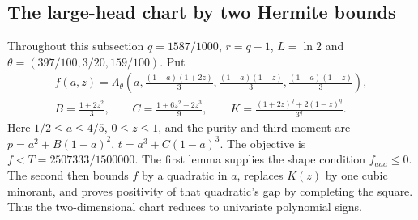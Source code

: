 \subsection{The large-head chart by two Hermite bounds}
\label{sec:fqe-large-head-dual}
Throughout this subsection $q=1587/1000$, $r=q-1$, $L=\ln2$ and
$\theta=(397/100,3/20,159/100)$. Put
\begin{gather*}
 f(a,z)=\Lambda_\theta\left(a,\frac{(1-a)(1+2z)}3,
              \frac{(1-a)(1-z)}3,\frac{(1-a)(1-z)}3\right),\\
 B=\frac{1+2z^2}3,\qquad C=\frac{1+6z^2+2z^3}9,\qquad
 K=\frac{(1+2z)^q+2(1-z)^q}{3^q}.
\end{gather*}
Here $1/2\le a\le4/5$, $0\le z\le1$, and the purity and third moment are
$p=a^2+B(1-a)^2$, $t=a^3+C(1-a)^3$.
The objective is $f<T=2507333/1500000$. The first lemma supplies the
shape condition $f_{aaa}\le0$. The second then bounds $f$ by a quadratic
in $a$, replaces $K(z)$ by one cubic minorant, and proves positivity of
that quadratic's gap by completing the square. Thus the two-dimensional
chart reduces to univariate polynomial signs.

